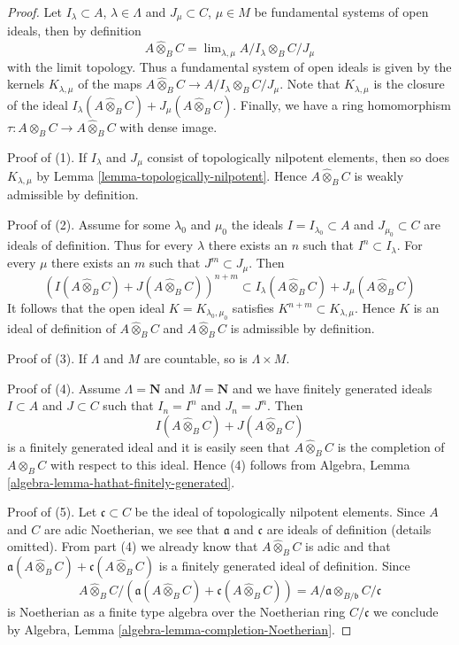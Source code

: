 \documentclass{stacks-project}
\theoremstyle{plain}
\theoremstyle{definition}
\theoremstyle{remark}
\numberwithin{equation}{subsection}
\def\lim{\mathop{\mathrm{lim}}\nolimits}
\begin{document}
\begin{proof}
Let $I_\lambda \subset A$, $\lambda \in \Lambda$ and
$J_\mu \subset C$, $\mu \in M$
be fundamental systems of open ideals, then by definition
$$
A \widehat{\otimes}_B C =
\lim_{\lambda, \mu} A/I_\lambda \otimes_B C/J_\mu
$$
with the limit topology. Thus a fundamental system of open ideals
is given by the kernels $K_{\lambda, \mu}$ of the maps
$A \widehat{\otimes}_B C \to A/I_\lambda \otimes_B C/J_\mu$.
Note that $K_{\lambda, \mu}$ is the closure of the ideal
$I_\lambda(A \widehat{\otimes}_B C) + J_\mu(A \widehat{\otimes}_B C)$.
Finally, we have a ring homomorphism
$\tau : A \otimes_B C \to A \widehat{\otimes}_B C$ with dense image.

\medskip\noindent
Proof of (1). If $I_\lambda$ and $J_\mu$ consist of topologically
nilpotent elements, then so does $K_{\lambda, \mu}$ by
Lemma \ref{lemma-topologically-nilpotent}. Hence 
$A \widehat{\otimes}_B C$ is weakly admissible by definition.

\medskip\noindent
Proof of (2). Assume for some $\lambda_0$ and $\mu_0$ the ideals
$I = I_{\lambda_0} \subset A$ and $J_{\mu_0} \subset C$ are ideals of
definition. Thus for every $\lambda$ there exists an $n$ such that
$I^n \subset I_\lambda$. For every $\mu$ there exists an $m$ such that
$J^m \subset J_\mu$. Then
$$
\left(I(A \widehat{\otimes}_B C) + J(A \widehat{\otimes}_B C)\right)^{n + m}
\subset
I_\lambda(A \widehat{\otimes}_B C) + J_\mu(A \widehat{\otimes}_B C)
$$
It follows that the open ideal $K = K_{\lambda_0, \mu_0}$
satisfies $K^{n + m} \subset K_{\lambda, \mu}$. Hence $K$
is an ideal of definition of $A \widehat{\otimes}_B C$
and $A \widehat{\otimes}_B C$ is admissible by definition.

\medskip\noindent
Proof of (3). If $\Lambda$ and $M$ are countable, so is
$\Lambda \times M$.

\medskip\noindent
Proof of (4). Assume $\Lambda = \mathbf{N}$ and $M = \mathbf{N}$
and we have finitely generated ideals $I \subset A$ and $J \subset C$
such that $I_n = I^n$ and $J_n = J^n$. Then
$$
I(A \widehat{\otimes}_B C) + J(A \widehat{\otimes}_B C)
$$
is a finitely generated ideal and it is easily seen that
$A \widehat{\otimes}_B C$ is the completion of
$A \otimes_B C$ with respect to this ideal. Hence (4)
follows from Algebra, Lemma \ref{algebra-lemma-hathat-finitely-generated}.

\medskip\noindent
Proof of (5).
Let $\mathfrak c \subset C$ be the ideal of topologically nilpotent elements.
Since $A$ and $C$ are adic Noetherian, we see that
$\mathfrak a$ and $\mathfrak c$ are ideals of definition (details omitted).
From part (4) we already know that
$A \widehat{\otimes}_B C$ is adic and that
$\mathfrak a(A \widehat{\otimes}_B C) + \mathfrak c(A \widehat{\otimes}_B C)$
is a finitely generated ideal of definition. Since
$$
A \widehat{\otimes}_B C /
\left(\mathfrak a(A \widehat{\otimes}_B C) +
\mathfrak c(A \widehat{\otimes}_B C)\right)
=
A/\mathfrak a \otimes_{B/\mathfrak b} C/\mathfrak c
$$
is Noetherian as a finite type algebra over the Noetherian ring
$C/\mathfrak c$ we conclude by
Algebra, Lemma \ref{algebra-lemma-completion-Noetherian}.
\end{proof}
\end{document}
